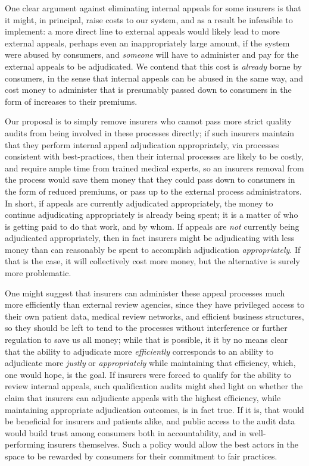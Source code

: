 \documentclass[12pt, a4paper,twoside,parskip=full]{report}
\theoremstyle{plain} %
\theoremstyle{definition} %
\theoremstyle{remark} %
\numberwithin{equation}{chapter}
\begin{document}
		One clear argument against eliminating internal appeals for some insurers is that it might, in principal, raise costs to our system, and as a result
		be infeasible to implement: a more direct line to external appeals would likely lead to more external appeals,
		perhaps even an inappropriately large amount, if the system were abused by consumers, and \emph{someone} will have to administer and
		pay for the external appeals to be adjudicated. We contend that this cost is \emph{already} borne by consumers, in the sense that internal appeals
		can be abused in the same way, and cost money to administer that is presumably passed down to consumers in the form of increases to their
		premiums. 
		
		Our proposal is to simply remove insurers who cannot pass more strict quality audits from being involved in these processes directly; 
		if such insurers maintain that they perform internal appeal adjudication appropriately, via processes consistent with best-practices, then their
		internal processes are likely to be costly, and require ample time from trained medical experts, so an insurers removal from the process would save them 
		money that they could pass down to consumers in the form of reduced premiums, or pass up to the external process administrators.
		In short, if appeals are currently adjudicated appropriately, the money to continue adjudicating appropriately is already being spent;
		it is a matter of who is getting paid to do that work, and by whom. If appeals are \emph{not} currently being adjudicated appropriately,
		then in fact insurers might be adjudicating with less money than can reasonably be spent to accomplish adjudication \emph{appropriately}.
		If that is the case, it will collectively cost more money, but the alternative is surely more problematic.
		
		One might suggest that insurers can administer these appeal processes much more efficiently than external review agencies, since they have privileged
		access to their own patient data, medical review networks, and efficient business structures, so they should be left to tend to the processes 
		without interference or further regulation to save us all money; while that is possible, it it by no means clear that the ability to adjudicate more \emph{efficiently} 
		corresponds to an ability to adjudicate more \emph{justly} or \emph{appropriately} while maintaining that efficiency, which, one would hope, is the goal. If insurers were forced to
		qualify for the ability to review internal appeals, such qualification audits might shed light on whether the claim that
		insurers can adjudicate appeals with the highest efficiency, while maintaining appropriate adjudication outcomes, is in fact true.
		If it is, that would be beneficial for insurers and patients alike, and public access to the audit data would build
		trust among consumers both in accountability, and in well-performing insurers themselves. Such a policy would
		allow the best actors in the space to be rewarded by consumers for their commitment to fair practices.
		
\end{document}
